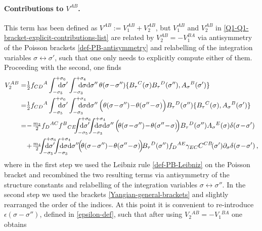 \documentclass[12pt]{article}
\numberwithin{equation}{section}
\begin{document}
\paragraph{Contributions to $V^{AB}$.}  This term has been defined as $V^{AB}:=V_{1}^{AB}+V_{2}^{AB}$, but $V_{1}^{AB}$ and $V_{2}^{AB}$ in \eqref{Q1-Q1-bracket-explicit-contributions-list} are related by $V_{2}^{AB}=-V_{1}^{BA}$ via antisymmetry of the Poisson brackets \eqref{def-PB-antisymmetry} and relabelling of the integration variables $\sigma \leftrightarrow \sigma'$, such that one only needs to explicitly compute either of them. Proceeding with the second, one finds
\begin{align}\label{V2AB-manipulations}
V_{2}^{AB}=&\tfrac{1}{2}f_{CD}{}^{A}\int_{-\sigma_{5}}^{+\sigma_{6}}\!\!\!\!\!\!\!\!\mathrm{d}\sigma' \int_{-\sigma_{3}}^{+\sigma_{4}}\!\!\!\!\!\!\!\!\mathrm{d}\sigma\mathrm{d}\sigma'' \, \theta(\sigma\!-\!\sigma'')\{B_{\tau}{}^{C}(\sigma)B_{\tau}{}^{D}(\sigma''),A_{\sigma}{}^{B}(\sigma')\}
\\
=& \tfrac{1}{2}f_{CD}{}^{A}\int_{-\sigma_{5}}^{+\sigma_{6}}\!\!\!\!\!\!\!\!\mathrm{d}\sigma' \int_{-\sigma_{3}}^{+\sigma_{4}}\!\!\!\!\!\!\!\!\mathrm{d}\sigma\mathrm{d}\sigma'' \, \Bigl(\theta(\sigma\!-\!\sigma'')\!-\!\theta(\sigma''\!-\!\sigma)\Bigr)B_{\tau}{}^{D}(\sigma'')\{B_{\tau}{}^{C}(\sigma),A_{\sigma}{}^{B}(\sigma')\}
\notag \\
=& \!-\!\tfrac{m_{3}}{2}f_{D}{}^{AC}f^{B}{}_{CE}\!\!\!\int_{-\sigma_{5}}^{+\sigma_{6}}\!\!\!\!\!\!\!\!\!\!\!\mathrm{d}\sigma' \!\!\int_{-\sigma_{3}}^{+\sigma_{4}}\!\!\!\!\!\!\!\!\!\!\!\mathrm{d}\sigma\mathrm{d}\sigma'' \, \Bigl(\!\theta(\sigma\!-\!\sigma'')\!-\!\theta(\sigma''\!-\!\sigma)\!\Bigr)B_{\tau}{}^{D}(\sigma'')A_{\sigma}{}^{E}(\sigma)\delta(\sigma\!-\!\sigma')
\notag \\
& \!+\!\tfrac{m_{4}}{2}\!\!\!\int_{-\sigma_{5}}^{+\sigma_{6}}\!\!\!\!\!\!\!\!\!\!\!\mathrm{d}\sigma' \!\! \int_{-\sigma_{3}}^{+\sigma_{4}}\!\!\!\!\!\!\!\!\!\!\!\mathrm{d}\sigma\mathrm{d}\sigma'' \! \Bigl(\!\theta(\sigma\!-\!\sigma'')\!-\!\theta(\sigma''\!-\!\sigma)\!\Bigr)\!B_{\tau}{}^{D}(\sigma'')f_{D}{}^{AE}\gamma_{EC}C^{CB}\!(\sigma')\partial_{\sigma}\delta(\sigma\!-\!\sigma') \,  ,
\notag
\end{align}
where in the first step we used the Leibniz rule \eqref{def-PB-Leibniz} on the Poisson bracket and recombined the two resulting terms via antisymmetry of the structure constants and relabelling of the integration variables $\sigma\leftrightarrow\sigma''$. In the second step we used the brackets \eqref{Yangian-general-brackets} and slightly rearranged the order of the indices. At this point it is convenient to re-introduce $\epsilon(\sigma-\sigma'')$, defined in \eqref{epsilon-def}, such that after using $V_{2}{}^{AB}=-V_{1}{}^{BA}$ one obtains
\end{document}
